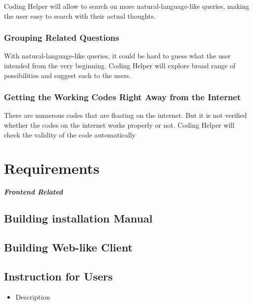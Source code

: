 \documentclass[conference]{IEEEtran}
\begin{document}
Coding Helper will allow to search on more natural-language-like queries, making the user easy to search with their actual thoughts.

\subsubsection{Grouping Related Questions}
With natural-language-like queries, it could be hard to guess what the user intended from the very beginning. Coding Helper will explore broad range of possibilities and suggest each to the users.

\subsubsection{Getting the Working Codes Right Away from the Internet}
There are numerous codes that are floating on the internet. But it is not verified whether the codes on the internet works properly or not. Coding Helper will check the validity of the code automatically 


\section{Requirements} %
\label{sec:requirements}


\textit{\textbf{Frontend Related}}

\subsection{Building installation Manual}
\textit{ }

\subsection{Building Web-like Client}
\textit{ }

\subsection{Instruction for Users}
\begin{itemize}
  \item Description
\end{itemize}
\textit{ }
\end{document}
